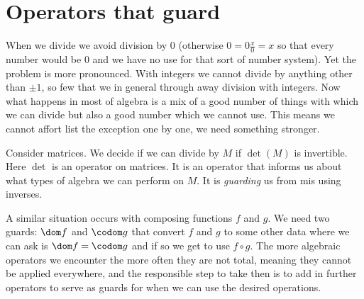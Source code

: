 



\section{Operators that guard}
When we divide we avoid division by $0$ (otherwise $0=0\frac{x}{0}=x$ so that every number
would be $0$ and we have no use for that sort of number system).  
Yet the problem is more pronounced.  With integers we cannot divide by anything other 
than $\pm 1$, so few that we in general through away division with integers.  
Now what happens in most of algebra is a mix of a good number of things with which we can 
divide but also a good number which we cannot use.  This means we cannot affort list 
the exception one by one, we need something stronger.

Consider matrices.  We decide if we can divide by $M$ if $\det(M)$ is invertible.
Here $\det$ is an operator on matrices.  It is an operator that informs us about 
what types of algebra we can perform on $M$.  It is \emph{guarding} us from mis using 
inverses.

A similar situation occurs with composing functions $f$ and $g$.  We need 
two guards: $\dom f$ and $\codom g$ that convert $f$ and $g$ to some other data 
where we can ask is $\dom f=\codom g$ and if so we get to use $f\circ g$.
The more algebraic operators we encounter the more often they are not total, 
meaning they cannot be applied everywhere, and the responsible step to take 
then is to add in further operators to serve as guards for when we can use the 
desired operations.